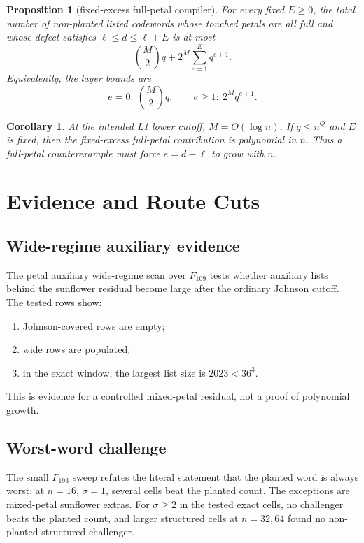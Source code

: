 \documentclass[11pt]{article}
\newtheorem{proposition}[theorem]{Proposition}
\newtheorem{corollary}[theorem]{Corollary}
\theoremstyle{definition}
\theoremstyle{remark}
\begin{document}
\begin{proposition}[fixed-excess full-petal compiler]\label{prop:fixed-excess}
For every fixed $E\ge0$, the total number of non-planted listed codewords whose
touched petals are all full and whose defect satisfies $\ell\le d\le\ell+E$
is at most
\[
        \binom M2 q + 2^M\sum_{e=1}^{E}q^{e+1}.
\]
Equivalently, the layer bounds are
\[
        e=0:\ \binom M2 q,\qquad
        e\ge1:\ 2^M q^{e+1}.
\]
\end{proposition}

\begin{corollary}
At the intended L1 lower cutoff, $M=O(\log n)$.  If $q\le n^Q$ and $E$ is
fixed, then the fixed-excess full-petal contribution is polynomial in $n$.
Thus a full-petal counterexample must force $e=d-\ell$ to grow with $n$.
\end{corollary}

\section{Evidence and Route Cuts}

\subsection{Wide-regime auxiliary evidence}

The petal auxiliary wide-regime scan over $F_{109}$ tests whether auxiliary
lists behind the sunflower residual become large after the ordinary Johnson
cutoff.  The tested rows show:
\begin{enumerate}[label=(\roman*)]
        \item Johnson-covered rows are empty;
        \item wide rows are populated;
        \item in the exact window, the largest list size is $2023<36^3$.
\end{enumerate}
This is evidence for a controlled mixed-petal residual, not a proof of
polynomial growth.

\subsection{Worst-word challenge}

The small $F_{193}$ sweep refutes the literal statement that the planted word
is always worst: at $n=16$, $\sigma=1$, several cells beat the planted count.
The exceptions are mixed-petal sunflower extras.  For $\sigma\ge2$ in the
tested exact cells, no challenger beats the planted count, and larger structured
cells at $n=32,64$ found no non-planted structured challenger.
\end{document}
